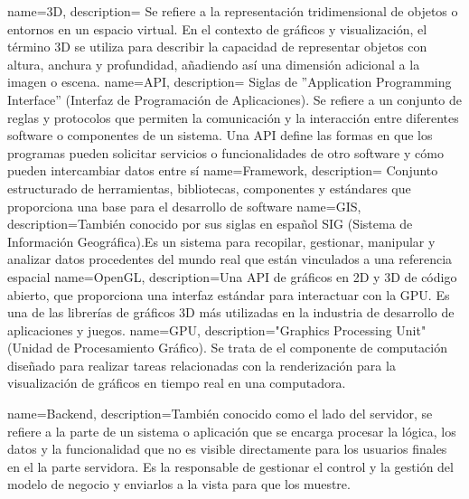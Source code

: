 \documentclass[a4paper, 11pt]{book}
\begin{document}
\printglossaries
{}
{
    name=3D,
    description={
    Se refiere a la representación tridimensional de objetos o entornos en un espacio virtual. En el contexto de gráficos y visualización, el término 3D se utiliza para describir la capacidad de representar objetos con altura, anchura y profundidad, añadiendo así una dimensión adicional a la imagen o escena.
    }
}
{
    name=API,
    description={
    Siglas de ''Application Programming Interface'' (Interfaz de Programación de Aplicaciones). Se refiere a un conjunto de reglas y protocolos que permiten la comunicación y la interacción entre diferentes software o componentes de un sistema. Una API define las formas en que los programas pueden solicitar servicios o funcionalidades de otro software y cómo pueden intercambiar datos entre sí
    }
}
{
    name=Framework,
    description={
    Conjunto estructurado de herramientas, bibliotecas, componentes y estándares que proporciona una base para el desarrollo de software
    }
}
{
    name=GIS,
    description={También conocido por sus siglas en español SIG (Sistema de Información Geográfica).Es un sistema para recopilar, gestionar, manipular y analizar datos procedentes del mundo real que están vinculados a una referencia espacial}
}
{
    name=OpenGL,
    description={Una API de gráficos en 2D y 3D de código abierto, que proporciona una interfaz estándar para interactuar con la GPU. Es una de las librerías de gráficos 3D más utilizadas en la industria de desarrollo de aplicaciones y juegos.}
}
{
    name=GPU,
    description={"Graphics Processing Unit" (Unidad de Procesamiento Gráfico). Se trata de el componente de computación diseñado para realizar tareas relacionadas con la renderización para la visualización de gráficos en tiempo real en una computadora.}
}

{
    name=Backend,
    description={También conocido como el lado del servidor, se refiere a la parte de un sistema o aplicación que se encarga procesar la lógica, los datos y la funcionalidad que no es visible directamente para los usuarios finales en el la parte servidora. Es la responsable de gestionar el control y la gestión del modelo de negocio y enviarlos a la vista para que los muestre.}
}
\end{document}
